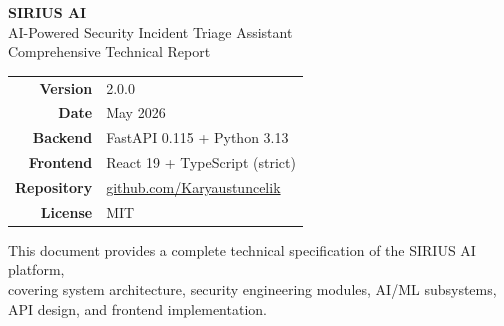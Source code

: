 \documentclass[12pt,a4paper]{article}
\begin{document}
\begin{titlepage}
  \centering
  \vspace*{1.5cm}

  {\Huge\bfseries\color{siriusblue} SIRIUS AI}\\[0.5em]
  {\Large\color{siriuspurple} AI-Powered Security Incident Triage Assistant}\\[0.3em]
  {\large\color{gray} Comprehensive Technical Report}

  \vspace{1.5cm}


  \vspace{1.5cm}

  \begin{tabular}{rl}
    \textbf{Version}    & 2.0.0 \\[0.3em]
    \textbf{Date}       & May 2026 \\[0.3em]
    \textbf{Backend}    & FastAPI 0.115 + Python 3.13 \\[0.3em]
    \textbf{Frontend}   & React 19 + TypeScript (strict) \\[0.3em]
    \textbf{Repository} & \href{https://github.com/Karyaustuncelik/AI-Powered-Security-Incident-Triage-Assistant}{github.com/Karyaustuncelik} \\[0.3em]
    \textbf{License}    & MIT \\
  \end{tabular}

  \vfill

  \begin{mdframed}[linecolor=siriusblue!40, backgroundcolor=siriusblue!5]
    \centering
    \small\color{gray}
    This document provides a complete technical specification of the SIRIUS AI platform,\\
    covering system architecture, security engineering modules, AI/ML subsystems,\\
    API design, and frontend implementation.
  \end{mdframed}

\end{titlepage}
\end{document}

